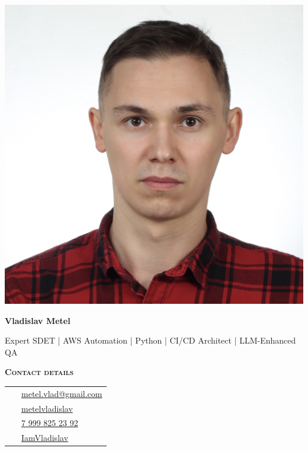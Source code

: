 \documentclass[10pt, a4paper]{article}
\newcommand{\headleft}[1]{\vspace*{2ex}\textsc{\textbf{#1}}\par%
	\vspace*{-1.5ex}\hrulefill\par\vspace*{0.7ex}}
\begin{document}
	
	\setlength{\topskip}{0pt}
	\setlength{\parindent}{0pt}
	\setlength{\parskip}{0pt}
	\setlength{\fboxsep}{0pt}
	\pagestyle{empty}
	\raggedbottom
	
	\begin{minipage}[t]{0.33\textwidth} %
		\colorbox{cvblue!90}{\color{white}  %
			\textwidth\relax%
			\begin{minipage}[t][297mm][t]{0.82\textwidth}
				\raggedright
				\vspace*{2ex} %
				\null\hfill\includegraphics[height=0.85\textwidth]{avatar.jpg}\hfill\null

				
				\vspace*{1.5ex}
				
				\Large  \textbf{Vladislav Metel} \normalsize 
				
				\vspace*{1.5ex}
				
				Expert SDET | AWS Automation | Python | CI/CD Architect | LLM-Enhanced QA
				
				\headleft{Contact details}
				
				\begin{tabular}{ @{}c l }
					\Letter\ & \href{mailto:metel.vlad@gmail.com?subject=Job Opportunity}{metel.vlad@gmail.com} \\
					\faLinkedin\ & \href{https://www.linkedin.com/in/metelvladislav}{metelvladislav} \\
					\faMobile*\ & \href{tel:+7 999 825 23 92}{\raisebox{0.2ex}{+}7 999 825 23 92} \\
					\faGithub\ & \href{https://github.com/IamVladislav}{IamVladislav} \\
				\end{tabular}
				

\end{minipage}}
\end{minipage}
\end{document}
